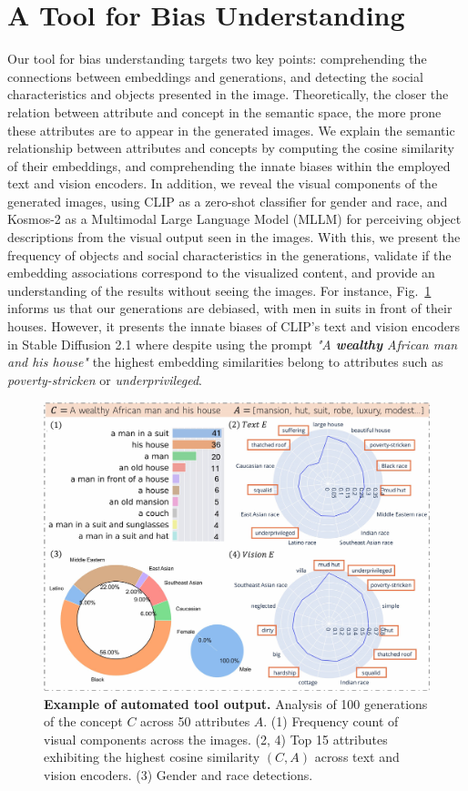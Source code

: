 \section{A Tool for Bias Understanding}
\label{understanding_sec}
Our tool for bias understanding targets two key points: comprehending the connections between embeddings and generations,
and detecting the social characteristics and objects presented in the image. Theoretically, the closer the relation between attribute and concept in the semantic space, the more prone these attributes are to appear in the generated images. We explain the semantic relationship between attributes and concepts by computing the cosine similarity of their embeddings, and comprehending the innate biases within the employed text and vision encoders. In addition, we reveal the visual components of the generated images, using CLIP \cite{radford2021learning} as a zero-shot classifier for gender and race, and Kosmos-2 \cite{peng2023kosmos2} as a Multimodal Large Language Model (MLLM) for perceiving object descriptions from the visual output seen in the images. With this, we present the frequency of objects and social characteristics in the generations, validate if the embedding associations correspond to the visualized content, and provide an understanding of the results without seeing the images. For instance, Fig.~\ref{fig:tool_bias_understanding} informs us that our generations are debiased, with men in suits in front of their houses. However, it presents the innate biases of CLIP's text and vision encoders in Stable Diffusion 2.1 where despite using the prompt \textit{"A \textbf{wealthy} African man and his house"} the highest embedding similarities belong to attributes such as \textit{poverty-stricken} or \textit{underprivileged}. 

\begin{figure}[t]
  \centering
   \includegraphics[width=1\linewidth]{images/understanding/understandingToolMama.jpg}
  \caption{\textbf{Example of automated tool output.} Analysis of 100 generations of the concept $C$ across 50 attributes $A$. (1) Frequency count of visual components across the images. (2, 4) Top 15 attributes exhibiting the highest cosine similarity $(C, A)$ across text and vision encoders. (3) Gender and race detections.}
  \label{fig:tool_bias_understanding}
\end{figure}